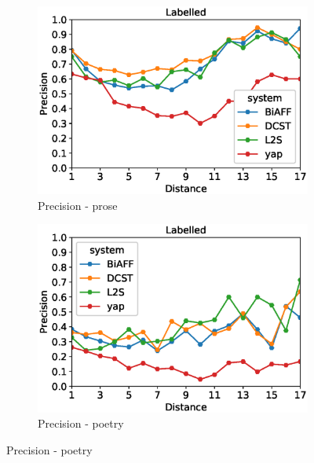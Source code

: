 \documentclass[11pt]{article}
\begin{document}
\begin{figure}[!ht]
        \centering
        \begin{subfigure}[b]{0.475\textwidth}
            \centering
            \includegraphics[width=\textwidth]{images/proseLabelledPrecision.eps}
            \caption[Network2]%
            {{\small Precision - prose}}    
            
        \end{subfigure}
        \hfill
        \begin{subfigure}[b]{0.475\textwidth}  
            \centering 
            \includegraphics[width=\textwidth]{images/poetryLabelledPrecision.eps}
            \caption[]%
            {{\small Precision - poetry}}    
            

\end{subfigure}
\end{figure}
\end{document}
